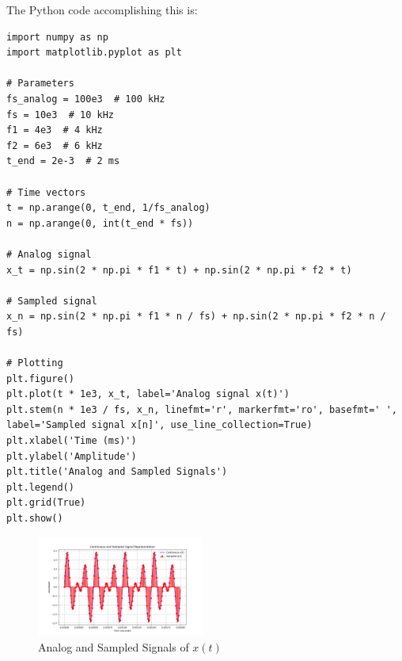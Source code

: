 
\item[(c)]
The Python code accomplishing this is:

\begin{verbatim}
import numpy as np
import matplotlib.pyplot as plt

# Parameters
fs_analog = 100e3  # 100 kHz
fs = 10e3  # 10 kHz
f1 = 4e3  # 4 kHz
f2 = 6e3  # 6 kHz
t_end = 2e-3  # 2 ms

# Time vectors
t = np.arange(0, t_end, 1/fs_analog)
n = np.arange(0, int(t_end * fs))

# Analog signal
x_t = np.sin(2 * np.pi * f1 * t) + np.sin(2 * np.pi * f2 * t)

# Sampled signal
x_n = np.sin(2 * np.pi * f1 * n / fs) + np.sin(2 * np.pi * f2 * n / fs)

# Plotting
plt.figure()
plt.plot(t * 1e3, x_t, label='Analog signal x(t)')
plt.stem(n * 1e3 / fs, x_n, linefmt='r', markerfmt='ro', basefmt=' ', label='Sampled signal x[n]', use_line_collection=True)
plt.xlabel('Time (ms)')
plt.ylabel('Amplitude')
plt.title('Analog and Sampled Signals')
plt.legend()
plt.grid(True)
plt.show()
\end{verbatim}

\begin{figure}[h]
    \centering
    \includegraphics[width=0.49\textwidth]{fig/ex1_c_plot}
    \caption{Analog and Sampled Signals of \(x(t)\)}
    \label{fig:ex1_c_plot}
\end{figure}
